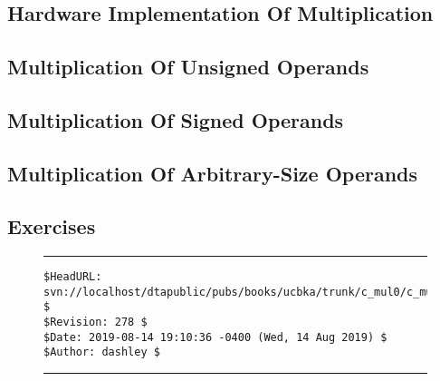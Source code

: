 
\chapter{\cmulzerolongtitle{}}

\label{cmul0}

\section{Hardware Implementation Of Multiplication}

\section{Multiplication Of Unsigned Operands}

\section{Multiplication Of Signed Operands}

\section{Multiplication Of Arbitrary-Size Operands}

\section{Exercises}



\noindent\begin{figure}[!b]
\noindent\rule[-0.25in]{\textwidth}{1pt}
\begin{tiny}
\begin{verbatim}
$HeadURL: svn://localhost/dtapublic/pubs/books/ucbka/trunk/c_mul0/c_mul0.tex $
$Revision: 278 $
$Date: 2019-08-14 19:10:36 -0400 (Wed, 14 Aug 2019) $
$Author: dashley $
\end{verbatim}
\end{tiny}
\noindent\rule[0.25in]{\textwidth}{1pt}
\end{figure}

%
